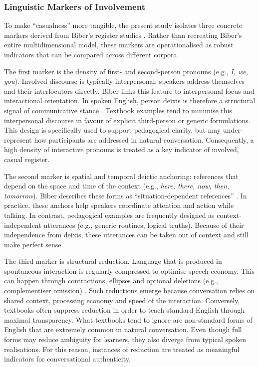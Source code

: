 \documentclass[11pt,a4paper]{article}
\begin{document}
\subsubsection{Linguistic Markers of Involvement}\label{subsubsec:linguistic-markers}

To make ``casualness'' more tangible, the present study isolates three concrete markers derived from Biber's register studies \parencite*{biber1988variation, biberGrammarSpokenWritten2021a}. Rather than recreating Biber's entire multidimensional model, these markers are operationalised as robust indicators that can be compared across different corpora.

The first marker is the density of first- and second-person pronouns (e.g., \textit{I, we, you}). Involved discourse is typically interpersonal: speakers address themselves and their interlocutors directly. Biber \parencite[105--106]{biber1988variation} links this feature to interpersonal focus and interactional orientation. In spoken English, person deixis is therefore a structural signal of communicative stance \parencite[578]{biberUniversityLanguageCorpusbased2006}. Textbook examples tend to minimise this interpersonal discourse in favour of explicit third-person or generic formulations. This design is specifically used to support pedagogical clarity, but may under-represent how participants are addressed in natural conversation. Consequently, a high density of interactive pronouns is treated as a key indicator of involved, casual register.

The second marker is spatial and temporal deictic anchoring: references that depend on the space and time of the context (e.g., \textit{here, there, now, then, tomorrow}). Biber describes these forms as ``situation-dependent references'' \parencite*[115]{biber1988variation}. In practice, these anchors help speakers coordinate attention and action while talking. In contrast, pedagogical examples are frequently designed as context-independent utterances (e.g., generic routines, logical truths). Because of their independence from deixis, these utterances can be taken out of context and still make perfect sense.

The third marker is structural reduction. Language that is produced in spontaneous interaction is regularly compressed to optimise speech economy. This can happen through contractions, ellipses and optional deletions (e.g., complementiser omission) \parencite[243]{biber1988variation}. Such reductions emerge because conversation relies on shared context, processing economy and speed of the interaction. Conversely, textbooks often suppress reduction in order to teach standard English through maximal transparency. What textbooks tend to ignore are non-standard forms of English that are extremely common in natural conversation. Even though full forms may reduce ambiguity for learners, they also diverge from typical spoken realisations. For this reason, instances of reduction are treated as meaningful indicators for conversational authenticity.
\end{document}

